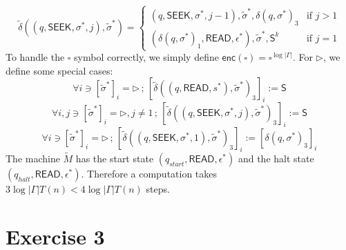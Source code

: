 \documentclass[12pt]{article}
\begin{document}
$$
\tilde{\delta}
((q, \textsf{SEEK}, \sigma^*, j), \tilde{\sigma}^*) =
\begin{cases}
(q, \textsf{SEEK}, \sigma^*, j-1),  \tilde{\sigma}^*, \delta(q,\sigma^*)_3 &
\text{if } j > 1 \\
(\delta(q,\sigma^*)_1, \textsf{READ}, \epsilon^*), \tilde{\sigma}^*, \textsf{S}^k &
\text{if } j = 1
\end{cases}
$$
To handle the $\square$ symbol correctly, we simply define $\textsf{enc}(\square) = \square^{\log|\Gamma|}$. For $\triangleright$, we define some special cases:
$$
\forall i \ni [\tilde{\sigma}^*]_i = \triangleright 
\,;\,
[\tilde{\delta}((q, \textsf{READ}, s^*), \tilde{\sigma}^*)_3]_i := \textsf{S}
$$
$$
\forall i, j \ni [\tilde{\sigma}^*]_i = \triangleright, j \neq 1 
\,;\,
[\tilde{\delta}((q, \textsf{SEEK}, \sigma^*, j), \tilde{\sigma}^*)_3]_i := \textsf{S}
$$
$$
\forall i \ni [\tilde{\sigma}^*]_i = \triangleright  
\,;\,
[\tilde{\delta}((q, \textsf{SEEK}, \sigma^*, 1), \tilde{\sigma}^*)_3]_i := [\delta(q, \sigma^*)_3]_i
$$
The machine $\tilde{M}$ has the start state $(q_{start}, \textsf{READ}, \epsilon^*)$ and the halt state $(q_{halt}, \textsf{READ}, \epsilon^*)$. Therefore a computation takes $3\log|\Gamma|T(n) < 4\log|\Gamma|T(n)$ steps.

\section*{Exercise 3}

\end{document}
